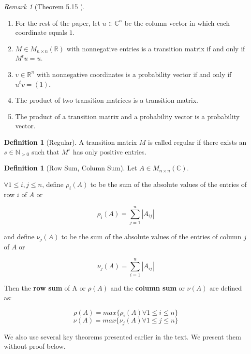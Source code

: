 \documentclass{amsart}
\theoremstyle{definition}
\newtheorem{definition}[thm]{Definition}
\theoremstyle{remark}
\newtheorem{remark}[thm]{Remark}
\numberwithin{equation}{section}
\begin{document}
\begin{remark}[Theorem 5.15 \cite{friedberg2003linear}]\label{theorem515}
\begin{enumerate}
    \item For the rest of the paper, let $u \in \mathbb{C}^n$ be the column vector in which each coordinate equals $1$.
    \item $M \in M_{n \times n }(\mathbb{R})$ with nonnegative entries is a transition matrix if and only if $M^tu = u$.
    \item $v \in \mathbb{R}^n$ with nonnegative coordinates is a probability vector if and only if $u^tv = (1)$.
    \item The product of two transition matrices is a transition matrix.
    \item The product of a transition matrix and a probability vector is a probability vector.
\end{enumerate}

\end{remark}




\begin{definition}[Regular]
A transition matrix $M$ is called regular if there exists an $s \in \mathbb{N}_{>0}$ such that $M^s$ has only positive entries.

\end{definition}

\begin{definition}[Row Sum, Column Sum]
Let $A \in M_{n \times n }(\mathbb{C})$.

$\forall 1 \leq i, j \leq n$, define $\rho_i(A)$ to be the sum of the absolute values of the entries of row $i$ of $A$ or

$$ \rho_i(A) = \sum_{j=1}^n|A_{ij}| $$

and define $\nu_j(A)$ to be the sum of the absolute values of the entries of column $j$ of $A$ or

$$ \nu_j(A) = \sum_{i=1}^n|A_{ij}| $$

Then the \textbf{row sum} of A or $\rho(A)$ and the \textbf{column sum} or $\nu(A)$ are defined as:

$$ \rho(A) = max\{\rho_i(A) \forall 1 \leq i \leq n \} $$
$$ \nu(A) = max\{\nu_j(A) \forall 1 \leq j \leq n \} $$

\end{definition}



We also use several key theorems presented earlier in the text.
We present them without proof below.
\end{document}
